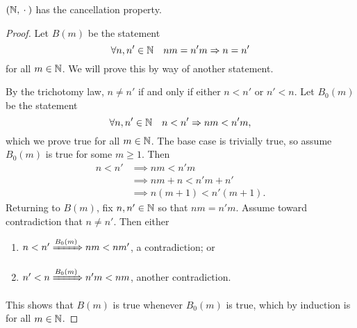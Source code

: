 \documentclass[master.tex]{subfiles}
\begin{document}
    \begin{lemma}[label=n-multiplicative-cancellation]
        $(\mathbb{N}, {}\cdot{}{})$ has the cancellation property.
        \tcblower
        \begin{proof}
            Let $B(m)$ be the statement
            \[
                \forall n, n' \in \mathbb{N} \quad nm = n'm \Rightarrow n = n'  
            \]
            for all $m \in \mathbb{N}$.
            We will prove this by way of another statement.

            By the trichotomy law, $n \neq n'$ if and only if either $n < n'$ or $n' < n$.
            Let $B_0(m)$ be the statement
            \[
                  \forall n, n' \in \mathbb{N} \quad n < n' \Rightarrow nm < n'm
            ,\]
            which we prove true for all $m \in \mathbb{N}$.
            The base case is trivially true, so assume $B_0(m)$ is true for some $m \geq 1$.
            Then
            \begin{align*}
                n < n' &\implies nm < n'm \\
                &\implies nm + n < n'm + n' \\
                &\implies n(m + 1) < n'(m + 1).
            \end{align*}
            Returning to $B(m)$, fix $n, n' \in \mathbb{N}$ so that $nm = n'm$.
            Assume toward contradiction that $n \neq n'$.
            Then either
            \begin{enumerate}
                \item $n < n' \xRightarrow{B_0(m)} nm < nm'$, a contradiction; or
                \item $n' < n \xRightarrow{B_0(m)} n'm < nm$, another contradiction.
            \end{enumerate}
            This shows that $B(m)$ is true whenever $B_0(m)$ is true, which by induction is for all $m \in \mathbb{N}$.
        \end{proof}
    \end{lemma}
\end{document}
